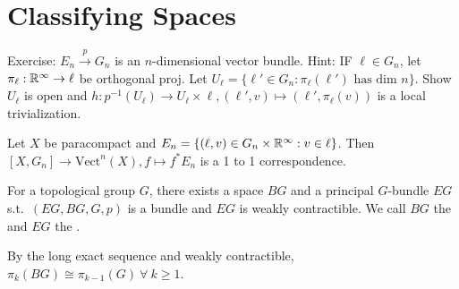 \documentclass[12pt,class=article,crop=false]{standalone}
\begin{document}
\section{Classifying Spaces}

Exercise: $ E_n  \xrightarrow{ p} G_n$ is an $ n$-dimensional vector bundle. Hint: IF  $ \ell \in G_n$, let $ \pi_{\ell}: \mathbb{R}^{\infty} \to \ell$ be orthogonal proj. Let $ U_\ell = \{\ell' \in G_n: \pi_{\ell}(\ell') \text{ has dim }n \} $. Show $ U_\ell$ is open and $ h: p ^{-1}(U_\ell) \to U_{ \ell} \times \ell, (\ell',v)\mapsto (\ell',\pi_\ell(v))$ is a local trivialization.

\begin{thm}
	Let $ X$ be paracompact and $ E_n = \{(\ell,v) \in G_n \times \mathbb{R}^{\infty}: v \in \ell\} $. Then $ [X,G_n] \to \text{Vect}^{n}(X), f\mapsto f^* E_n $ is a 1 to 1 correspondence.
\end{thm}

\begin{defn}
For a topological group $ G$, there exists a space  $ BG$ and a principal  $ G$-bundle  $ EG$  s.t.\ $ (EG,BG,G,p)$ is a bundle and  $ EG$ is weakly contractible. We call  $ BG$ the   and $ EG$ the  .  
\end{defn}

\begin{remark}
By the long exact sequence and weakly contractible, $ \pi_k(BG) \cong \pi_{k-1}(G) \ \forall \ k \geq 1$.
\end{remark}
\end{document}
